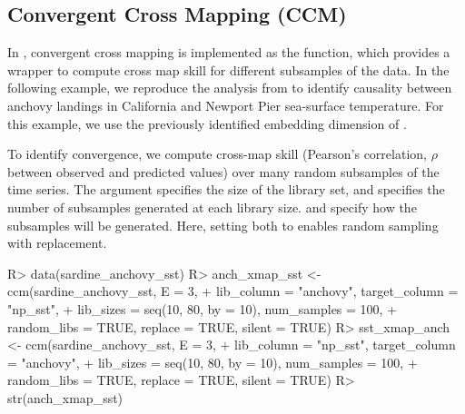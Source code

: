 \documentclass[article]{jss}
\begin{document}
\subsection{Convergent Cross Mapping (CCM)}\label{sec:ccm}

In , convergent cross mapping is implemented as the  function, which provides a wrapper to compute cross map skill for different subsamples of the data. In the following example, we reproduce the analysis from \citet{Sugihara_2012} to identify causality between anchovy landings in California and Newport Pier sea-surface temperature. For this example, we use the previously identified embedding dimension of .

To identify convergence, we compute cross-map skill (Pearson's correlation, $\rho$ between observed and predicted values) over many random subsamples of the time series. The  argument specifies the size of the library set, and  specifies the number of subsamples generated at each library size.  and  specify how the subsamples will be generated. Here, setting both to  enables random sampling with replacement.

\begin{Schunk}
\begin{Sinput}
R> data(sardine_anchovy_sst)
R> anch_xmap_sst <- ccm(sardine_anchovy_sst, E = 3,
+                       lib_column = "anchovy", target_column = "np_sst",
+                       lib_sizes = seq(10, 80, by = 10), num_samples = 100,
+                       random_libs = TRUE, replace = TRUE, silent = TRUE)
R> sst_xmap_anch <- ccm(sardine_anchovy_sst, E = 3,
+                       lib_column = "np_sst", target_column = "anchovy",
+                       lib_sizes = seq(10, 80, by = 10), num_samples = 100,
+                       random_libs = TRUE, replace = TRUE, silent = TRUE)
R> str(anch_xmap_sst)
\end{Sinput}
\end{Schunk}
\end{document}
